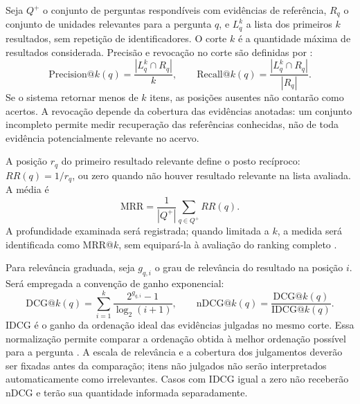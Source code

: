 Seja $Q^+$ o conjunto de perguntas respondíveis com evidências de referência, $R_q$ o conjunto de unidades relevantes para a pergunta $q$, e $L_q^k$ a lista dos primeiros $k$ resultados, sem repetição de identificadores. O corte $k$ é a quantidade máxima de resultados considerada. Precisão e revocação no corte são definidas por \parencite{manningEtAl2008informationRetrieval}:
\begin{equation}
\mathrm{Precision@}k(q)=\frac{|L_q^k\cap R_q|}{k},\qquad
\mathrm{Recall@}k(q)=\frac{|L_q^k\cap R_q|}{|R_q|}.
\end{equation}
Se o sistema retornar menos de $k$ itens, as posições ausentes não contarão como acertos. A revocação depende da cobertura das evidências anotadas: um conjunto incompleto permite medir recuperação das referências conhecidas, não de toda evidência potencialmente relevante no acervo.

A posição $r_q$ do primeiro resultado relevante define o posto recíproco: $RR(q)=1/r_q$, ou zero quando não houver resultado relevante na lista avaliada. A média é
\begin{equation}
\mathrm{MRR}=\frac{1}{|Q^+|}\sum_{q\in Q^+}RR(q).
\end{equation}
A profundidade examinada será registrada; quando limitada a $k$, a medida será identificada como MRR@$k$, sem equipará-la à avaliação do ranking completo \parencite{thakurEtAl2021beir}.

Para relevância graduada, seja $g_{q,i}$ o grau de relevância do resultado na posição $i$. Será empregada a convenção de ganho exponencial:
\begin{equation}
\mathrm{DCG@}k(q)=\sum_{i=1}^{k}\frac{2^{g_{q,i}}-1}{\log_2(i+1)},\qquad
\mathrm{nDCG@}k(q)=\frac{\mathrm{DCG@}k(q)}{\mathrm{IDCG@}k(q)}.
\end{equation}
IDCG é o ganho da ordenação ideal das evidências julgadas no mesmo corte. Essa normalização permite comparar a ordenação obtida à melhor ordenação possível para a pergunta \parencite{manningEtAl2008informationRetrieval}. A escala de relevância e a cobertura dos julgamentos deverão ser fixadas antes da comparação; itens não julgados não serão interpretados automaticamente como irrelevantes. Casos com IDCG igual a zero não receberão nDCG e terão sua quantidade informada separadamente.

